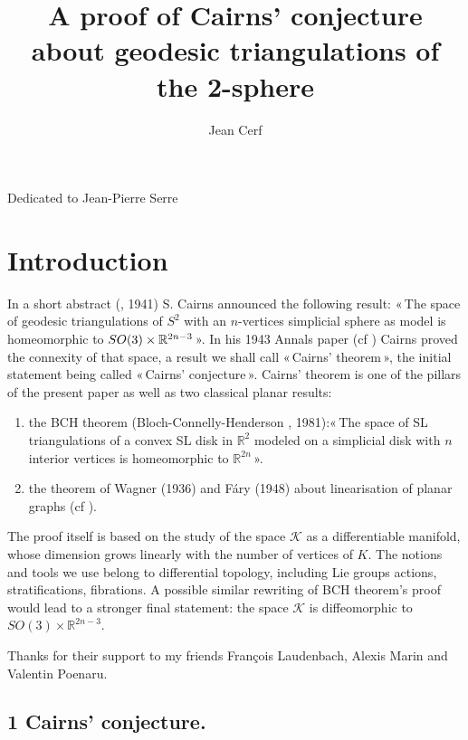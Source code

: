 \documentclass[12pt]{article}
\title{A proof of Cairns' conjecture
about geodesic triangulations of the 2-sphere}
\date{}
\author{Jean Cerf}
\begin{document}
\maketitle
\vspace{-2.5 cm}
\begin{center}
 Dedicated to Jean-Pierre Serre
{\section*{Introduction}}
\end{center}
In a short abstract (\cite{cairns1}, 1941) S. Cairns announced the following result: «\,The space of geodesic triangulations of $S^2$ with an $n$-vertices simplicial sphere as model is homeomorphic to $ \\ SO(3)\times \mathbb{R}^{2n-3}$\,». In his 1943 Annals paper (cf \cite{cairns2}) Cairns proved the connexity of that space, a result we shall call «\,Cairns' theorem\,», the initial statement being called «\,Cairns' conjecture\,».
Cairns' theorem is one of the pillars of the present paper as well as two classical planar results:
\begin{enumerate}
    \item the BCH theorem (Bloch-Connelly-Henderson \cite{bloch}, 1981):\newline «\,The space of SL triangulations of a convex SL disk in $\mathbb{R}^2$ modeled on a simplicial disk with $n$ interior vertices is homeomorphic to $\mathbb{R}^{2n}$\,».
    \item the theorem of Wagner (1936) and Fáry (1948) about linearisation of planar graphs (cf \cite{richter}).
\end{enumerate}
The proof itself is based on the study of the space $\mathcal{K}$ as a differentiable manifold, whose dimension grows linearly with the number of vertices of $K$. The notions and tools we use belong to differential topology, including Lie groups actions, stratifications, fibrations. A possible similar rewriting of BCH theorem's proof would lead to a stronger final statement: the space $\mathcal{K}$ is diffeomorphic to $SO(3) \times \mathbb{R}^{2n-3}$.

Thanks for their support to my friends François Laudenbach, Alexis Marin and Valentin Poenaru.

\subsection*{ 1 Cairns' conjecture.}
\end{document}
